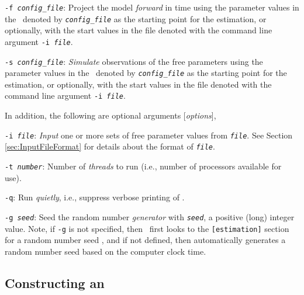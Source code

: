 \begin{description}
\item \texttt{-f \emph{config\_file}}:{\hspace{0.5cm} Project the model \emph{forward} in time using the parameter values in the \config\ denoted by \emph{\texttt{config\_file}} as the starting point for the estimation, or optionally, with the start values in the file denoted with the command line argument \texttt{-i \emph{file}}.}

\item \texttt{-s \emph{config\_file}}:{\hspace{0.5cm} \emph{Simulate} observations of the free parameters using the parameter values in the \config\ denoted by \emph{\texttt{config\_file}} as the starting point for the estimation, or optionally, with the start values in the file denoted with the command line argument \texttt{-i \emph{file}}.}

\end{description}

In addition, the following are optional arguments [\emph{options}],

\begin{description}
\item \texttt{-i \emph{file}}:{\hspace*{0.5cm} \emph{Input} one or more sets of free parameter values from \texttt{\emph{file}}. See Section \ref{sec:InputFileFormat} for details about the format of \texttt{\emph{file}}.}

\item \texttt{-t \emph{number}}:{\hspace*{0.5cm} Number of \emph{threads} to run (i.e., number of processors available for use).}

\item \texttt{-q}:{\hspace*{0.5cm} Run \emph{quietly}, i.e., suppress verbose printing of \SPM.}

\item \texttt{-g \emph{seed}}:{\hspace*{0.5cm} Seed the random number \emph{generator} with \texttt{\emph{seed}}, a positive (long) integer value. Note, if \texttt{-g} is not specified, then \SPM\ first looks to the \texttt{[estimation]} section for a random number seed , and if not defined, then automatically generates a random number seed based on the computer clock time.}
\end{description}

\subsection{Constructing an \SPM\ \config \label{constructing-spm-config}}

